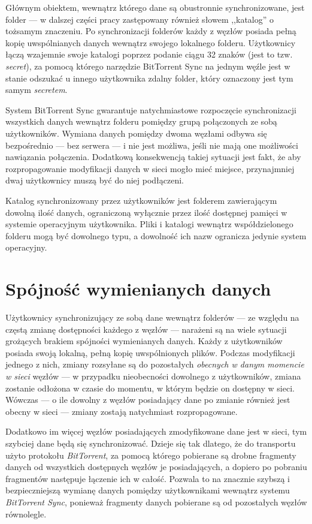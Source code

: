 Głównym obiektem, wewnątrz którego dane są obustronnie synchronizowane, jest folder --- w dalszej części pracy zastępowany również słowem ,,katalog'' o tożsamym znaczeniu. Po synchronizacji folderów każdy z węzłów posiada pełną kopię uwspólnianych danych wewnątrz swojego lokalnego folderu. Użytkownicy łączą wzajemnie swoje katalogi poprzez podanie ciągu 32 znaków (jest to tzw. \emph{secret}), za pomocą którego narzędzie BitTorrent Sync na jednym węźle jest w stanie odszukać u innego użytkownika zdalny folder, który oznaczony jest tym samym \emph{secretem}. 

System BitTorrent Sync gwarantuje natychmiastowe rozpoczęcie synchronizacji wszystkich danych wewnątrz folderu pomiędzy grupą połączonych ze sobą użytkowników. Wymiana danych pomiędzy dwoma węzłami odbywa się bezpośrednio --- bez serwera --- i nie jest możliwa, jeśli nie mają one możliwości nawiązania połączenia. Dodatkową konsekwencją takiej sytuacji jest fakt, że aby rozpropagowanie modyfikacji danych w sieci mogło mieć miejsce, przynajmniej dwaj użytkownicy muszą być do niej podłączeni.

Katalog synchronizowany przez użytkowników jest folderem zawierającym dowolną ilość danych, ograniczoną wyłącznie przez ilość dostępnej pamięci w systemie operacyjnym użytkownika. Pliki i katalogi wewnątrz współdzielonego folderu mogą być dowolnego typu, a dowolność ich nazw ogranicza jedynie system operacyjny.

\section*{Spójność wymienianych danych}

Użytkownicy synchronizujący ze sobą dane wewnątrz folderów --- ze względu na częstą zmianę dostępności każdego z węzłów --- narażeni są na wiele sytuacji grożących brakiem spójności wymienianych danych. Każdy z użytkowników posiada swoją lokalną, pełną kopię uwspólnionych plików. Podczas modyfikacji jednego z nich, zmiany rozsyłane są do pozostałych \emph{obecnych w danym momencie w sieci} węzłów --- w przypadku nieobecności dowolnego z użytkowników, zmiana zostanie odłożona w czasie do momentu, w którym będzie on dostępny w sieci. Wówczas --- o ile dowolny z węzłów posiadający dane po zmianie również jest obecny w sieci --- zmiany zostają natychmiast rozpropagowane.

Dodatkowo im więcej węzłów posiadających zmodyfikowane dane jest w sieci, tym szybciej dane będą się synchronizować. Dzieje się tak dlatego, że do transportu użyto protokołu \emph{BitTorrent}, za pomocą którego pobierane są drobne fragmenty danych od wszystkich dostępnych węzłów je posiadających, a dopiero po pobraniu fragmentów następuje łączenie ich w całość. Pozwala to na znacznie szybszą i bezpieczniejszą wymianę danych pomiędzy użytkownikami wewnątrz systemu \emph{BitTorrent Sync}, ponieważ fragmenty danych pobierane są od pozostałych węzłów równolegle.


